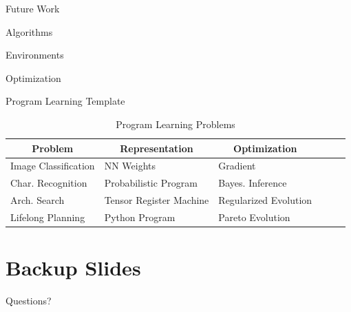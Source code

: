 \documentclass[aspectratio=169]{beamer}
\makeatletter
\renewcommand{\emph}[1]{{\Huge \color{pureminimalistic@text@red} #1}}
\newcommand{\white}[1]{{\color{pureminimalistic@text@white} #1}}
\newcommand{\red}[1]{{\color{pureminimalistic@text@red} #1}}
\makeatother
\begin{document}
\begin{frame}{\white{Future Work}}
    \begin{vfilleditems}
    \item \emph{Algorithms} 
    \item \emph{Environments} 
    \item \emph{Optimization} 
    \end{vfilleditems}
\end{frame}

\begin{frame}{Program Learning Template}
\begin{table}[h]
{\small 
\caption{Program Learning Problems}
\label{environments}
\begin{center}
\begin{tabular}{l|lllll}
\hline \hline
\multicolumn{1}{c}{\bf Problem}  & 
\multicolumn{1}{c}{\bf Representation} &  
\multicolumn{1}{c}{\bf Optimization} \\  
\hline
Image Classification & NN Weights              & Gradient \\
Char. Recognition    & Probabilistic Program   & Bayes. Inference \\
Arch. Search         & Tensor Register Machine & Regularized Evolution \\
Lifelong Planning    & Python Program          & Pareto Evolution \\
\hline \hline
\end{tabular}
\end{center}}
\end{table}
\end{frame}

\begin{frame}[plain]{}
    \centering
    \vfill
    {\fontsize{40}{50}\selectfont \red{No Free Lunch}}
    \vfill
\end{frame}

\appendix %
\section*{Backup Slides}

\begin{frame}
  \centering
  \vfill
  {\fontsize{40}{50}\selectfont Questions?}
  \vfill
\end{frame}

\begin{frame}
  \centering
  \printbibliography
\end{frame}
\end{document}
